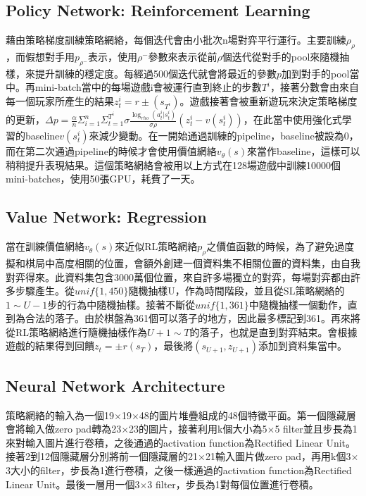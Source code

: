 \documentclass[a4paper,12pt]{article}
\begin{document}
\subsection{Policy Network: Reinforcement Learning}
\qquad 藉由策略梯度訓練策略網絡，每個迭代會由小批次n場對弈平行運行。主要訓練$\rho_{\rho}$，而假想對手用$p_{\rho^{-}}$表示，使用$\rho^{-}$參數來表示從前$\rho$個迭代從對手的pool來隨機抽樣，來提升訓練的穩定度。每經過500個迭代就會將最近的參數$p$加到對手的pool當中。再mini-batch當中的每場遊戲i會被運行直到終止的步數$T^{i}$，接著分數會由來自每一個玩家所產生的結果$z^{i}_{t}=r\pm(s_{T^{i}})$。遊戲接著會被重新遊玩來決定策略梯度的更新，$\Delta p=\frac{\alpha}{n}\Sigma^{n}_{i=1}\Sigma^{T^{i}}_{t=1}\sigma \frac{\log_{rho}(a^{i}_{t}|s^{i}_{t})}{\sigma \rho}(z^{i}_{t}-v(s^{i}_{t}))$，在此當中使用強化式學習的baseline$v(s^{i}_{t})$來減少變動。在一開始通過訓練的pipeline，baseline被設為0，而在第二次通過pipeline的時候才會使用價值網絡$v_{\theta}(s)$來當作baseline，這樣可以稍稍提升表現結果。這個策略網絡會被用以上方式在128場遊戲中訓練10000個mini-batches，使用50張GPU，耗費了一天。

\subsection{Value Network: Regression}
\qquad 當在訓練價值網絡$v_{\theta}(s)$來近似RL策略網絡$p_{\rho}$之價值函數的時候，為了避免過度擬和棋局中高度相關的位置，會額外創建一個資料集不相關位置的資料集，由自我對弈得來。此資料集包含3000萬個位置，來自許多場獨立的對弈，每場對弈都由許多步驟產生。從$unif\{1,450\}$隨機抽樣U，作為時間階段，並且從SL策略網絡的$1\sim U-1$步的行為中隨機抽樣。接著不斷從$unif\{1,361\}$中隨機抽樣一個動作，直到為合法的落子。由於棋盤為361個可以落子的地方，因此最多標記到361。再來將從RL策略網絡進行隨機抽樣作為$U+1\sim T$的落子，也就是直到對弈結束。會根據遊戲的結果得到回饋$z_{t}=\pm r(s_{T})$，最後將$(s_{U+1},z_{U+1})$添加到資料集當中。

\subsection{Neural Network  Architecture}
\qquad 策略網絡的輸入為一個19$\times$19$\times$48的圖片堆疊組成的48個特徵平面。第一個隱藏層會將輸入做zero pad轉為23$\times$23的圖片，接著利用k個大小為5$\times$5 filter並且步長為1來對輸入圖片進行卷積，之後通過的activation function為Rectified Linear Unit。接著2到12個隱藏層分別將前一個隱藏層的21$\times$21輸入圖片做zero pad，再用k個3$\times$3大小的filter，步長為1進行卷積，之後一樣通過的activation function為Rectified Linear Unit。最後一層用一個3$\times$3 filter，步長為1對每個位置進行卷積。
\end{document}
